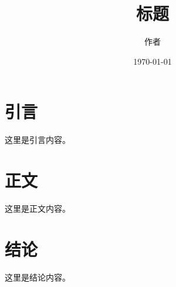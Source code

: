 \documentclass[UTF8]{ctexart}
\title{标题}
\author{作者}
\date{\today}
\begin{document}
\maketitle

\section{引言}
这里是引言内容。

\section{正文}
这里是正文内容。

\section{结论}
这里是结论内容。
\end{document}
